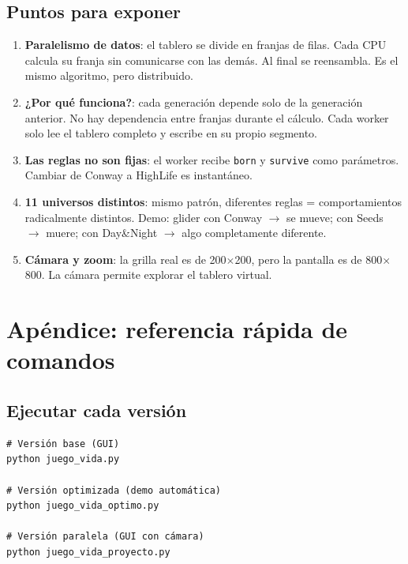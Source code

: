 \documentclass[12pt,a4paper]{article}
\begin{document}
\subsection{Puntos para exponer}

\begin{enumerate}
  \item \textbf{Paralelismo de datos}: el tablero se divide en franjas de filas.
        Cada CPU calcula su franja sin comunicarse con las demás. Al final se reensambla.
        Es el mismo algoritmo, pero distribuido.
  \item \textbf{¿Por qué funciona?}: cada generación depende solo de la generación
        anterior. No hay dependencia entre franjas durante el cálculo. Cada worker
        solo lee el tablero completo y escribe en su propio segmento.
  \item \textbf{Las reglas no son fijas}: el worker recibe \texttt{born} y \texttt{survive}
        como parámetros. Cambiar de Conway a HighLife es instantáneo.
  \item \textbf{11 universos distintos}: mismo patrón, diferentes reglas = comportamientos
        radicalmente distintos. Demo: glider con Conway $\to$ se mueve; con Seeds $\to$ muere;
        con Day\&Night $\to$ algo completamente diferente.
  \item \textbf{Cámara y zoom}: la grilla real es de 200$\times$200, pero la pantalla
        es de 800$\times$800. La cámara permite explorar el tablero virtual.
\end{enumerate}

\newpage

\section{Apéndice: referencia rápida de comandos}

\subsection{Ejecutar cada versión}

\begin{verbatim}
# Versión base (GUI)
python juego_vida.py

# Versión optimizada (demo automática)
python juego_vida_optimo.py

# Versión paralela (GUI con cámara)
python juego_vida_proyecto.py
\end{verbatim}
\end{document}
